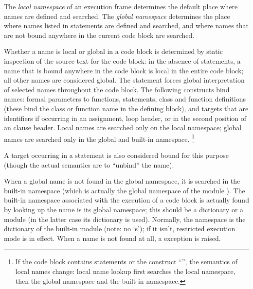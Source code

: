 The {\em local namespace} of an execution frame determines the default
place where names are defined and searched.  The {\em global
namespace} determines the place where names listed in 
statements are defined and searched, and where names that are not
bound anywhere in the current code block are searched.

Whether a name is local or global in a code block is determined by
static inspection of the source text for the code block: in the
absence of  statements, a name that is bound anywhere
in the code block is local in the entire code block; all other names
are considered global.  The  statement forces global
interpretation of selected names throughout the code block.  The
following constructs bind names: formal parameters to functions,
 statements, class and function definitions (these
bind the class or function name in the defining block), and targets
that are identifiers if occurring in an assignment,  loop
header, or in the second position of an  clause
header.  Local names are searched only on the local namespace; global
names are searched only in the global and built-in namespace.%
%
\footnote{If the code block contains  statements or the
construct ``'', the semantics of local
names change: local name lookup first searches the local namespace,
then the global namespace and the built-in namespace.}

A target occurring in a  statement is also considered bound
for this purpose (though the actual semantics are to ``unbind'' the
name).

When a global name is not found in the global namespace, it is
searched in the built-in namespace (which is actually the global
namespace of the module ).  The built-in namespace
associated with the execution of a code block is actually found by
looking up the name  is its global namespace; this
should be a dictionary or a module (in the latter case its dictionary
is used).  Normally, the  namespace is the
dictionary of the built-in module  (note: no `s');
if it isn't, restricted execution mode is in effect.  When a name is
not found at all, a  exception is raised.%

